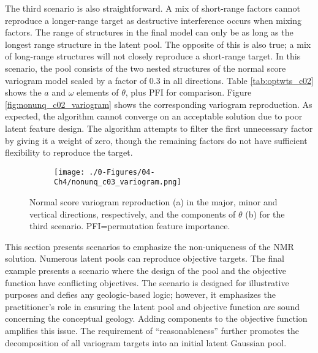 The third scenario is also straightforward. A mix of short-range factors cannot reproduce a longer-range target as destructive interference occurs when mixing factors. The range of structures in the final model can only be as long as the longest range structure in the latent pool. The opposite of this is also true; a mix of long-range structures will not closely reproduce a short-range target. In this scenario, the pool consists of the two nested structures of the normal score variogram model scaled by a factor of 0.3 in all directions. Table \ref{tab:optwts_c02} shows the $a$ and $\omega$ elements of $\theta$, plus \gls{PFI} for comparison. Figure \ref{fig:nonunq_c02_variogram} shows the corresponding variogram reproduction. As expected, the algorithm cannot converge on an acceptable solution due to poor latent feature design. The algorithm attempts to filter the first unnecessary factor by giving it a weight of zero, though the remaining factors do not have sufficient flexibility to reproduce the target.

\begin{figure}
    \begin{subfigure}{1.\textwidth}
        \centering
        \texttt{[image: ./0-Figures/04-Ch4/nonunq\_c03\_variogram.png]}
        \caption{}
        \label{fig:nonunq_c03_variogram}
    \end{subfigure}
    \begin{subtable}{1.\textwidth}
        \centering
        \resizebox{1\width}{!}{}
        \caption{}
        \label{tab:optwts_c03}
    \end{subtable}
    \caption{Normal score variogram reproduction (a) in the major, minor and vertical directions, respectively, and the components of $\theta$ (b) for the third scenario. PFI=permutation feature importance. }
    \label{}
\end{figure}

This section presents scenarios to emphasize the non-uniqueness of the \gls{NMR} solution. Numerous latent pools can reproduce objective targets. The final example presents a scenario where the design of the pool and the objective function have conflicting objectives. The scenario is designed for illustrative purposes and defies any geologic-based logic; however, it emphasizes the practitioner's role in ensuring the latent pool and objective function are sound concerning the conceptual geology. Adding components to the objective function amplifies this issue. The requirement of ``reasonableness'' further promotes the decomposition of all variogram targets into an initial latent Gaussian pool.

